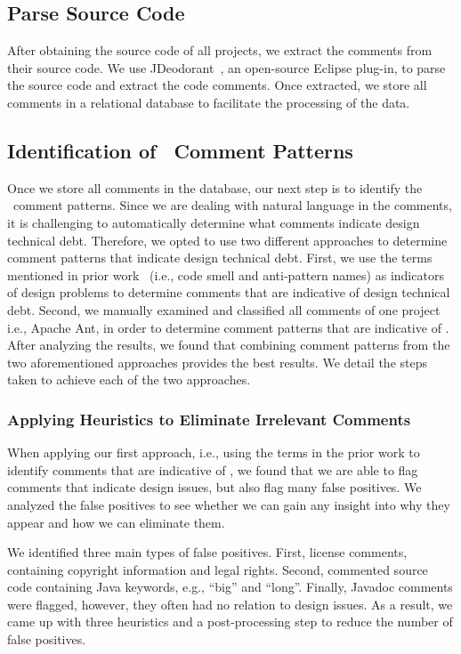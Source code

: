  
\subsection{Parse Source Code}

After obtaining the source code of all projects, we extract the comments from their source code. We use JDeodorant~\cite{Tsantalis2008CSMR}, an open-source Eclipse plug-in, to parse the source code and extract the code comments. Once extracted, we store all comments in a relational database to facilitate the processing of the data.

\subsection{Identification of \SADTD~Comment Patterns}
Once we store all comments in the database, our next step is to identify the \SADTD~comment patterns. Since we are dealing with natural language in the comments, it is challenging to automatically determine what comments indicate design technical debt. Therefore, we opted to use two different approaches to determine comment patterns that indicate design technical debt. First, we use the terms mentioned in prior work~\cite{fowler1999refactoring,brown1998antipatterns,martin2009clean} (i.e., code smell and anti-pattern names) as indicators of design problems to determine comments that are indicative of design technical debt. Second, we manually examined and classified all  comments of one project i.e., Apache Ant, in order to determine comment patterns that are indicative of \SADTD. After analyzing the results, we found that combining comment patterns from the two aforementioned approaches provides the best results. We detail the steps taken to achieve each of the two approaches.

\subsubsection{Applying Heuristics to Eliminate Irrelevant Comments}

When applying our first approach, i.e., using the terms in the prior work to identify comments that are indicative of \SADTD, we found that we are able to flag comments that indicate design issues, but also flag many false positives. We analyzed the false positives to see whether we can gain any insight into why they appear and how we can eliminate them. 

We identified three main types of false positives. First, license comments, containing copyright information and legal rights. Second, commented source code containing Java keywords, e.g., ``big'' and ``long''. Finally, Javadoc comments were flagged, however, they often had no relation to design issues. As a result, we came up with three heuristics and a post-processing step to reduce the number of false positives.

